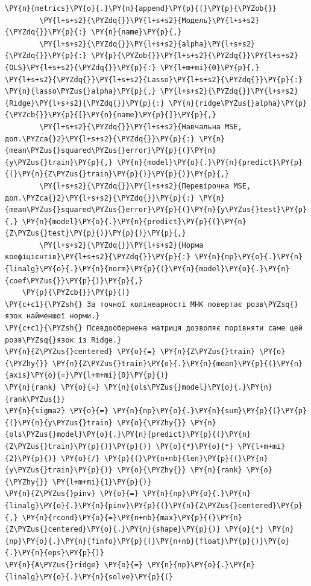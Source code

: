 \begin{Verbatim}[commandchars=\\\{\}]
    \PY{n}{metrics}\PY{o}{.}\PY{n}{append}\PY{p}{(}\PY{p}{\PYZob{}}
        \PY{l+s+s2}{\PYZdq{}}\PY{l+s+s2}{Модель}\PY{l+s+s2}{\PYZdq{}}\PY{p}{:} \PY{n}{name}\PY{p}{,}
        \PY{l+s+s2}{\PYZdq{}}\PY{l+s+s2}{alpha}\PY{l+s+s2}{\PYZdq{}}\PY{p}{:} \PY{p}{\PYZob{}}\PY{l+s+s2}{\PYZdq{}}\PY{l+s+s2}{OLS}\PY{l+s+s2}{\PYZdq{}}\PY{p}{:} \PY{l+m+mi}{0}\PY{p}{,} \PY{l+s+s2}{\PYZdq{}}\PY{l+s+s2}{Lasso}\PY{l+s+s2}{\PYZdq{}}\PY{p}{:} \PY{n}{lasso\PYZus{}alpha}\PY{p}{,} \PY{l+s+s2}{\PYZdq{}}\PY{l+s+s2}{Ridge}\PY{l+s+s2}{\PYZdq{}}\PY{p}{:} \PY{n}{ridge\PYZus{}alpha}\PY{p}{\PYZcb{}}\PY{p}{[}\PY{n}{name}\PY{p}{]}\PY{p}{,}
        \PY{l+s+s2}{\PYZdq{}}\PY{l+s+s2}{Навчальна MSE, дол.\PYZca{}2}\PY{l+s+s2}{\PYZdq{}}\PY{p}{:} \PY{n}{mean\PYZus{}squared\PYZus{}error}\PY{p}{(}\PY{n}{y\PYZus{}train}\PY{p}{,} \PY{n}{model}\PY{o}{.}\PY{n}{predict}\PY{p}{(}\PY{n}{Z\PYZus{}train}\PY{p}{)}\PY{p}{)}\PY{p}{,}
        \PY{l+s+s2}{\PYZdq{}}\PY{l+s+s2}{Перевірочна MSE, дол.\PYZca{}2}\PY{l+s+s2}{\PYZdq{}}\PY{p}{:} \PY{n}{mean\PYZus{}squared\PYZus{}error}\PY{p}{(}\PY{n}{y\PYZus{}test}\PY{p}{,} \PY{n}{model}\PY{o}{.}\PY{n}{predict}\PY{p}{(}\PY{n}{Z\PYZus{}test}\PY{p}{)}\PY{p}{)}\PY{p}{,}
        \PY{l+s+s2}{\PYZdq{}}\PY{l+s+s2}{Норма коефіцієнтів}\PY{l+s+s2}{\PYZdq{}}\PY{p}{:} \PY{n}{np}\PY{o}{.}\PY{n}{linalg}\PY{o}{.}\PY{n}{norm}\PY{p}{(}\PY{n}{model}\PY{o}{.}\PY{n}{coef\PYZus{}}\PY{p}{)}\PY{p}{,}
    \PY{p}{\PYZcb{}}\PY{p}{)}
\PY{c+c1}{\PYZsh{} За точної колінеарності МНК повертає розв\PYZsq{}язок найменшої норми.}
\PY{c+c1}{\PYZsh{} Псевдообернена матриця дозволяє порівняти саме цей розв\PYZsq{}язок із Ridge.}
\PY{n}{Z\PYZus{}centered} \PY{o}{=} \PY{n}{Z\PYZus{}train} \PY{o}{\PYZhy{}} \PY{n}{Z\PYZus{}train}\PY{o}{.}\PY{n}{mean}\PY{p}{(}\PY{n}{axis}\PY{o}{=}\PY{l+m+mi}{0}\PY{p}{)}
\PY{n}{rank} \PY{o}{=} \PY{n}{ols\PYZus{}model}\PY{o}{.}\PY{n}{rank\PYZus{}}
\PY{n}{sigma2} \PY{o}{=} \PY{n}{np}\PY{o}{.}\PY{n}{sum}\PY{p}{(}\PY{p}{(}\PY{n}{y\PYZus{}train} \PY{o}{\PYZhy{}} \PY{n}{ols\PYZus{}model}\PY{o}{.}\PY{n}{predict}\PY{p}{(}\PY{n}{Z\PYZus{}train}\PY{p}{)}\PY{p}{)} \PY{o}{*}\PY{o}{*} \PY{l+m+mi}{2}\PY{p}{)} \PY{o}{/} \PY{p}{(}\PY{n+nb}{len}\PY{p}{(}\PY{n}{y\PYZus{}train}\PY{p}{)} \PY{o}{\PYZhy{}} \PY{n}{rank} \PY{o}{\PYZhy{}} \PY{l+m+mi}{1}\PY{p}{)}
\PY{n}{Z\PYZus{}pinv} \PY{o}{=} \PY{n}{np}\PY{o}{.}\PY{n}{linalg}\PY{o}{.}\PY{n}{pinv}\PY{p}{(}\PY{n}{Z\PYZus{}centered}\PY{p}{,} \PY{n}{rcond}\PY{o}{=}\PY{n+nb}{max}\PY{p}{(}\PY{n}{Z\PYZus{}centered}\PY{o}{.}\PY{n}{shape}\PY{p}{)} \PY{o}{*} \PY{n}{np}\PY{o}{.}\PY{n}{finfo}\PY{p}{(}\PY{n+nb}{float}\PY{p}{)}\PY{o}{.}\PY{n}{eps}\PY{p}{)}
\PY{n}{A\PYZus{}ridge} \PY{o}{=} \PY{n}{np}\PY{o}{.}\PY{n}{linalg}\PY{o}{.}\PY{n}{solve}\PY{p}{(}

\end{Verbatim}
